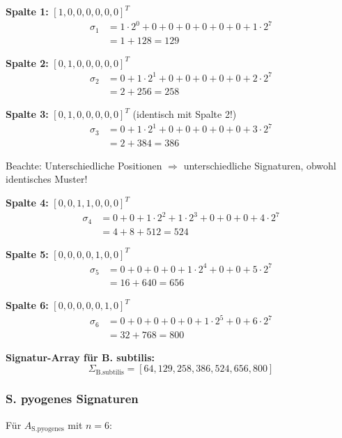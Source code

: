 \documentclass[a4paper,12pt]{article}
\theoremstyle{definition}
\begin{document}
\textbf{Spalte 1: } $[1, 0, 0, 0, 0, 0, 0]^T$
\begin{align*}
\sigma_1 &= 1 \cdot 2^0 + 0 + 0 + 0 + 0 + 0 + 0 + 1 \cdot 2^7 \\
&= 1 + 128 = \boxed{129}
\end{align*}

\textbf{Spalte 2: } $[0, 1, 0, 0, 0, 0, 0]^T$
\begin{align*}
\sigma_2 &= 0 + 1 \cdot 2^1 + 0 + 0 + 0 + 0 + 0 + 2 \cdot 2^7 \\
&= 2 + 256 = \boxed{258}
\end{align*}

\textbf{Spalte 3: } $[0, 1, 0, 0, 0, 0, 0]^T$ (identisch mit Spalte 2!)
\begin{align*}
\sigma_3 &= 0 + 1 \cdot 2^1 + 0 + 0 + 0 + 0 + 0 + 3 \cdot 2^7 \\
&= 2 + 384 = \boxed{386}
\end{align*}

Beachte: Unterschiedliche Positionen $\Rightarrow$ unterschiedliche Signaturen, obwohl identisches Muster!

\textbf{Spalte 4: } $[0, 0, 1, 1, 0, 0, 0]^T$
\begin{align*}
\sigma_4 &= 0 + 0 + 1 \cdot 2^2 + 1 \cdot 2^3 + 0 + 0 + 0 + 4 \cdot 2^7 \\
&= 4 + 8 + 512 = \boxed{524}
\end{align*}

\textbf{Spalte 5: } $[0, 0, 0, 0, 1, 0, 0]^T$
\begin{align*}
\sigma_5 &= 0 + 0 + 0 + 0 + 1 \cdot 2^4 + 0 + 0 + 5 \cdot 2^7 \\
&= 16 + 640 = \boxed{656}
\end{align*}

\textbf{Spalte 6: } $[0, 0, 0, 0, 0, 1, 0]^T$
\begin{align*}
\sigma_6 &= 0 + 0 + 0 + 0 + 0 + 1 \cdot 2^5 + 0 + 6 \cdot 2^7 \\
&= 32 + 768 = \boxed{800}
\end{align*}

\textbf{Signatur-Array für B. subtilis:}
\[
\boxed{\Sigma_{\text{B.subtilis}} = [64, 129, 258, 386, 524, 656, 800]}
\]


\subsubsection*{S. pyogenes Signaturen}

Für $A_{\text{S.pyogenes}}$ mit $n = 6$:
\end{document}
